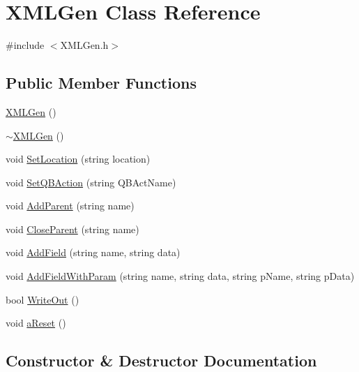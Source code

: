\hypertarget{class_x_m_l_gen}{}\section{X\+M\+L\+Gen Class Reference}
\label{class_x_m_l_gen}


{\ttfamily \#include $<$X\+M\+L\+Gen.\+h$>$}

\subsection*{Public Member Functions}
\begin{DoxyCompactItemize}
\item 
\hyperlink{class_x_m_l_gen_ad45ea148e0694fc773713b5606be8e1a}{X\+M\+L\+Gen} ()
\item 
\hyperlink{class_x_m_l_gen_a4d1f4210a87bcf18a8e7847bd3a24f45}{$\sim$\+X\+M\+L\+Gen} ()
\item 
void \hyperlink{class_x_m_l_gen_a8d56da65790ba691c908ab470a9d8ace}{Set\+Location} (string location)
\item 
void \hyperlink{class_x_m_l_gen_ad440a660d2fbe66dfebbf86e2232618d}{Set\+Q\+B\+Action} (string Q\+B\+Act\+Name)
\item 
void \hyperlink{class_x_m_l_gen_a017a799085841759bb6adcc97bd9187e}{Add\+Parent} (string name)
\item 
void \hyperlink{class_x_m_l_gen_aab1e7dfadedd526713bcbe1c3057ae2c}{Close\+Parent} (string name)
\item 
void \hyperlink{class_x_m_l_gen_a1d94ee8db00ec0d7918a44fd59a8ee90}{Add\+Field} (string name, string data)
\item 
void \hyperlink{class_x_m_l_gen_add03ae6f55c8e083b6fad6fac39f0eb7}{Add\+Field\+With\+Param} (string name, string data, string p\+Name, string p\+Data)
\item 
bool \hyperlink{class_x_m_l_gen_a64c71a8286c2c563763b9332640322b0}{Write\+Out} ()
\item 
void \hyperlink{class_x_m_l_gen_a27b2bc8bb98a70fd9b1e58d995b8e986}{a\+Reset} ()
\end{DoxyCompactItemize}


\subsection{Constructor \& Destructor Documentation}
\hypertarget{class_x_m_l_gen_ad45ea148e0694fc773713b5606be8e1a}{}
